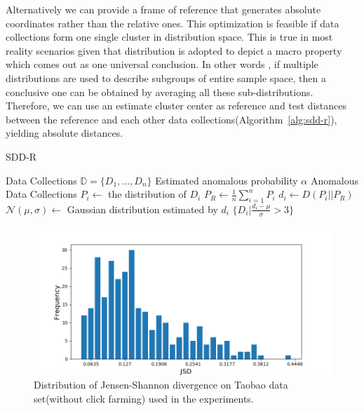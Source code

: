 \documentclass[10pt,conference,letterpaper]{article}
\begin{document}
			Alternatively we can provide a frame of reference that generates absolute coordinates rather than the relative ones. This optimization is feasible if data collections form one single cluster in distribution space. This is true in most reality scenarios given that distribution is adopted to depict a macro property which comes out as one universal conclusion. In other words , if multiple distributions are used to describe subgroups of entire sample space, then a conclusive one can be obtained by averaging all these sub-distributions. Therefore, we can use an estimate cluster center as reference and test distances between the reference and each other data collections(Algorithm~\ref{alg:sdd-r}), yielding absolute distances.
			
			\begin{algorithm}[!t]
				\caption{SDD-R}
				\label{alg:sdd-r}
				\begin{algorithmic}[1]
					\Require Data Collections $\mathbb{D} = \{D_1, \dots, D_n\}$
					\Require Estimated anomalous probability $\alpha$
					\Ensure Anomalous Data Collections
						\State $P_i \gets$ the distribution of $D_i$
					\EndFor
					\State $P_R \gets \frac{1}{n}\sum_{i = 1}^n P_i$
						\State $d_i \gets D(P_i||P_R)$
					\EndFor
					\State $\mathcal{N}(\mu, \sigma) \gets$ Gaussian distribution estimated by $d_i$
					\State \Return $\{D_i | \frac{d_i - \mu}{\sigma} > 3 \}$
				\end{algorithmic}
			\end{algorithm}
			
			\begin{figure}[!t]
				\centering
				\includegraphics[width=\linewidth]{fig/JSD-Dist.png}
				\caption{Distribution of Jensen-Shannon divergence on Taobao data set(without click farming) used in the experiments.}
				\label{fig:jsd-dist}
			\end{figure}
			
\end{document}
